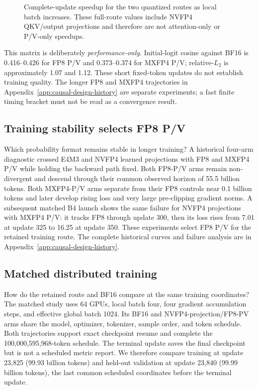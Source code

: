 \begin{figure}[tbp]
\centering
{}
\caption{Complete-update speedup for the two quantized routes as local
batch increases.  These full-route values include NVFP4 QKV/output projections
and therefore are not attention-only or P/V-only speedups.}
\label{fig:llama8b-e2e-breakdown}
\end{figure}

This matrix is deliberately \emph{performance-only}.  Initial-logit cosine
against BF16 is 0.416--0.426 for FP8 P/V and 0.373--0.374 for MXFP4 P/V;
relative-$L_2$ is approximately 1.07 and 1.12.  These short fixed-token updates
do not establish training quality.  The longer FP8 and MXFP4 trajectories in
Appendix~\ref{app:causal-design-history} are separate experiments; a fast
finite timing bracket must not be read as a convergence result.

\subsection{Training stability selects FP8 P/V}

Which probability format remains stable in longer training?  A historical
four-arm diagnostic crossed E4M3 and NVFP4 learned projections with FP8 and
MXFP4 P/V while holding the backward path fixed.  Both FP8-P/V arms remain
non-divergent and descend through their common observed horizon of 55.5
billion tokens.  Both MXFP4-P/V arms separate from their FP8 controls near
0.1 billion tokens and later develop rising loss and very large pre-clipping
gradient norms.  A subsequent matched B4 launch shows the same failure for
NVFP4 projections with MXFP4 P/V: it tracks FP8 through update 300, then its
loss rises from 7.01 at update 325 to 16.25 at update 350.  These experiments
select FP8 P/V for the retained training route.  The complete historical
curves and failure analysis are in
Appendix~\ref{app:causal-design-history}.

\subsection{Matched distributed training}

How do the retained route and BF16 compare at the same training coordinates?
The matched study uses 64 GPUs, local batch four, four gradient
accumulation steps, and effective global batch 1024.  Its BF16 and
NVFP4-projection/FP8-PV arms share the model, optimizer, tokenizer, sample
order, and token schedule.  Both trajectories support exact checkpoint
resume and complete the 100,000,595,968-token schedule.  The terminal update
saves the final checkpoint but is not a scheduled metric report.  We therefore
compare training at update 23,825 (99.93 billion tokens) and held-out
validation at update 23,840 (99.99 billion tokens), the last common scheduled
coordinates before the terminal update.

